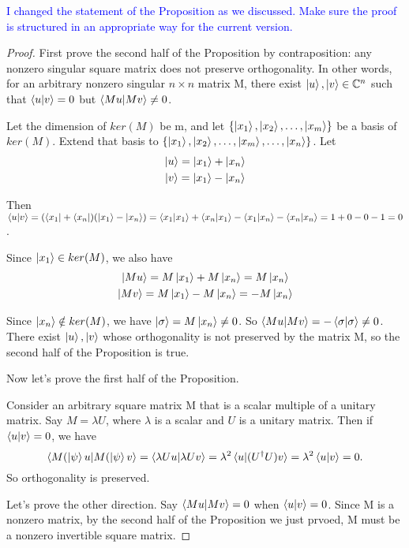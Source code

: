 \textcolor{blue}{I changed the statement of the Proposition as we discussed.  Make sure the proof is structured in an appropriate way for the current version.}


\begin{proof}
First prove the second half of the Proposition by contraposition: any nonzero singular square matrix does not preserve orthogonality. In other words, for an arbitrary nonzero singular $n \times n$ matrix M, there exist $\ket{u}, \ket{v} \in \mathbb{C}^n$ such that $\braket{u|v}=0$ but $\braket{Mu|Mv} \ne 0$.

Let the dimension of $ker(M)$ be m, and let $\{\ket{x_1}, \ket{x_2},\hdots, \ket{x_m}\}$ be a basis of $ker(M)$. Extend that basis to $\{\ket{x_1}, \ket{x_2},\hdots, \ket{x_m}, \hdots, \ket{x_n}\}$. Let
\begin{gather*}
    \ket{u}=\ket{x_1}+\ket{x_n}\\
    \ket{v}=\ket{x_1}-\ket{x_n}
\end{gather*}

Then $\braket{u|v}=(\bra{x_1}+\bra{x_n})(\ket{x_1}-\ket{x_n})=\braket{x_1|x_1}+\braket{x_n|x_1}-\braket{x_1|x_n}-\braket{x_n|x_n}=1+0-0-1=0$.

Since $\ket{x_1} \in ker(M)$, we also have
\begin{gather*}
    \ket{Mu}=M\ket{x_1}+M\ket{x_n}=M\ket{x_n}\\
    \ket{Mv}=M\ket{x_1}-M\ket{x_n}=-M\ket{x_n}    
\end{gather*}

Since $\ket{x_n} \notin ker(M)$, we have $\ket{\sigma}=M\ket{x_n} \ne 0$. So $\braket{Mu|Mv}=-\braket{\sigma|\sigma} \ne 0$. There exist $\ket{u}, \ket{v}$ whose orthogonality is not preserved by the matrix M, so the second half of the Proposition is true.

\bigskip
Now let's prove the first half of the Proposition.

Consider an arbitrary square matrix M that is a scalar multiple of a unitary matrix. Say $M=\lambda U$, where $\lambda$ is a scalar and $U$ is a unitary matrix.
Then if $\braket{u|v}=0$, we have
$$\braket{M(\ket{\psi}u|M(\ket{\psi}v}=\braket{\lambda Uu|\lambda Uv}=\lambda^2 \braket{u|(U^\dagger U)v}=\lambda^2 \braket{u|v}=0.$$ So orthogonality is preserved.

\bigskip
Let's prove the other direction. Say $\braket{Mu|Mv}=0$ when $\braket{u|v}=0$. Since M is a nonzero matrix, by the second half of the Proposition we just prvoed, M must be a nonzero invertible square matrix. 


\end{proof}
